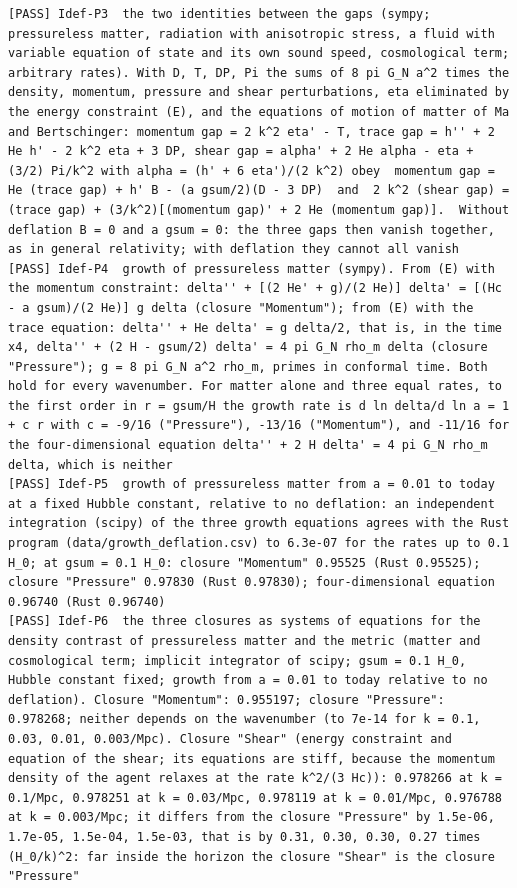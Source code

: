 \documentclass[
  10pt,
]{article}
\begin{document}
\begin{verbatim}
[PASS] Idef-P3  the two identities between the gaps (sympy; pressureless matter, radiation with anisotropic stress, a fluid with variable equation of state and its own sound speed, cosmological term; arbitrary rates). With D, T, DP, Pi the sums of 8 pi G_N a^2 times the density, momentum, pressure and shear perturbations, eta eliminated by the energy constraint (E), and the equations of motion of matter of Ma and Bertschinger: momentum gap = 2 k^2 eta' - T, trace gap = h'' + 2 He h' - 2 k^2 eta + 3 DP, shear gap = alpha' + 2 He alpha - eta + (3/2) Pi/k^2 with alpha = (h' + 6 eta')/(2 k^2) obey  momentum gap = He (trace gap) + h' B - (a gsum/2)(D - 3 DP)  and  2 k^2 (shear gap) = (trace gap) + (3/k^2)[(momentum gap)' + 2 He (momentum gap)].  Without deflation B = 0 and a gsum = 0: the three gaps then vanish together, as in general relativity; with deflation they cannot all vanish
[PASS] Idef-P4  growth of pressureless matter (sympy). From (E) with the momentum constraint: delta'' + [(2 He' + g)/(2 He)] delta' = [(Hc - a gsum)/(2 He)] g delta (closure "Momentum"); from (E) with the trace equation: delta'' + He delta' = g delta/2, that is, in the time x4, delta'' + (2 H - gsum/2) delta' = 4 pi G_N rho_m delta (closure "Pressure"); g = 8 pi G_N a^2 rho_m, primes in conformal time. Both hold for every wavenumber. For matter alone and three equal rates, to the first order in r = gsum/H the growth rate is d ln delta/d ln a = 1 + c r with c = -9/16 ("Pressure"), -13/16 ("Momentum"), and -11/16 for the four-dimensional equation delta'' + 2 H delta' = 4 pi G_N rho_m delta, which is neither
[PASS] Idef-P5  growth of pressureless matter from a = 0.01 to today at a fixed Hubble constant, relative to no deflation: an independent integration (scipy) of the three growth equations agrees with the Rust program (data/growth_deflation.csv) to 6.3e-07 for the rates up to 0.1 H_0; at gsum = 0.1 H_0: closure "Momentum" 0.95525 (Rust 0.95525); closure "Pressure" 0.97830 (Rust 0.97830); four-dimensional equation 0.96740 (Rust 0.96740)
[PASS] Idef-P6  the three closures as systems of equations for the density contrast of pressureless matter and the metric (matter and cosmological term; implicit integrator of scipy; gsum = 0.1 H_0, Hubble constant fixed; growth from a = 0.01 to today relative to no deflation). Closure "Momentum": 0.955197; closure "Pressure": 0.978268; neither depends on the wavenumber (to 7e-14 for k = 0.1, 0.03, 0.01, 0.003/Mpc). Closure "Shear" (energy constraint and equation of the shear; its equations are stiff, because the momentum density of the agent relaxes at the rate k^2/(3 Hc)): 0.978266 at k = 0.1/Mpc, 0.978251 at k = 0.03/Mpc, 0.978119 at k = 0.01/Mpc, 0.976788 at k = 0.003/Mpc; it differs from the closure "Pressure" by 1.5e-06, 1.7e-05, 1.5e-04, 1.5e-03, that is by 0.31, 0.30, 0.30, 0.27 times (H_0/k)^2: far inside the horizon the closure "Shear" is the closure "Pressure"

\end{verbatim}
\end{document}
